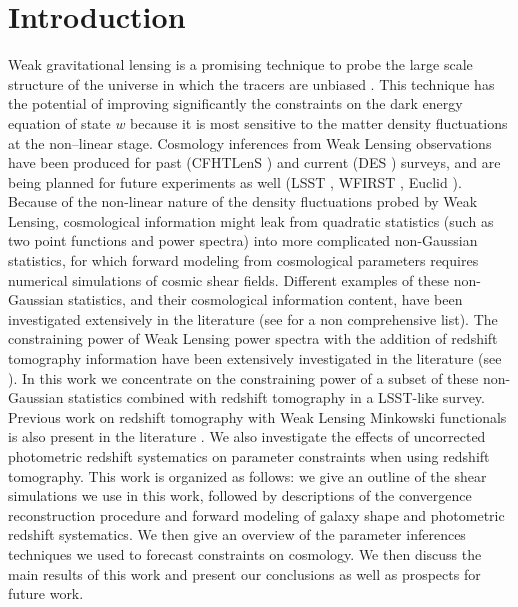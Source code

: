 \documentclass[reprint,aps,prd,superscriptaddress,showkeys,showpacs]{revtex4-1}
\begin{document}
\section{Introduction}
%
Weak gravitational lensing is a promising technique to probe the large scale structure of the universe in which the tracers are unbiased \citep{wlreview}. This technique has the potential of improving significantly the constraints on the dark energy equation of state $w$ because it is most sensitive to the matter density fluctuations at the non--linear stage. Cosmology inferences from Weak Lensing observations have been produced for past (CFHTLenS \citep{cfht1}) and current (DES \citep{DES}) surveys, and are being planned for future experiments as well (LSST \citep{LSST}, WFIRST \citep{WFIRST}, Euclid \citep{Euclid}). Because of the non-linear nature of the density fluctuations probed by Weak Lensing, cosmological information might leak from quadratic statistics (such as two point functions and power spectra) into more complicated non-Gaussian statistics, for which forward modeling from cosmological parameters requires numerical simulations of cosmic shear fields. Different examples of these non-Gaussian statistics, and their cosmological information content, have been investigated extensively in the literature (see \citep{MinkJan,PeaksJan,NG-Marian,NG-Jain1,NG-Jain2,NG-Jain3,NG-Refregier,NG-Dietrich} for a non comprehensive list). The constraining power of Weak Lensing power spectra with the addition of redshift tomography information have been extensively investigated in the literature (see \citep{SongKnox,FangHaiman07,Huterer2006}). In this work we concentrate on the constraining power of a subset of these non-Gaussian statistics combined with redshift tomography in a LSST-like survey. Previous work on redshift tomography with Weak Lensing Minkowski functionals is also present in the literature \citep{MinkJan}. We also investigate the effects of uncorrected photometric redshift systematics on parameter constraints when using redshift tomography. This work is organized as follows: we give an outline of the shear simulations we use in this work, followed by descriptions of the convergence reconstruction procedure and forward modeling of galaxy shape and photometric redshift systematics. We then give an overview of the parameter inferences techniques we used to forecast constraints on cosmology. We then discuss the main results of this work and present our conclusions as well as prospects for future work.  

\end{document}
